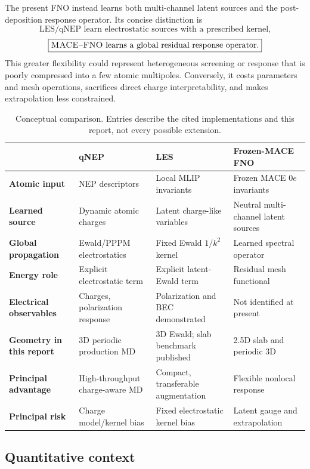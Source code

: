 \documentclass[11pt]{article}
\newcommand{\macefno}{\textsc{MACE--FNO}}
\begin{document}
The present FNO instead learns both multi-channel latent sources and the
post-deposition response operator. Its concise distinction is
\[
\boxed{\text{LES/qNEP learn electrostatic sources with a prescribed kernel,}}
\]
\[
\boxed{\text{\macefno{} learns a global residual response operator.}}
\]
This greater flexibility could represent heterogeneous screening or response
that is poorly compressed into a few atomic multipoles. Conversely, it costs
parameters and mesh operations, sacrifices direct charge interpretability,
and makes extrapolation less constrained.

\begin{table}[t]
\centering
\caption{Conceptual comparison. Entries describe the cited implementations
and this report, not every possible extension.}
\label{tab:method-comparison}
\small
\begin{tabularx}{\textwidth}{>{\bfseries}lXXX}
\toprule
 & qNEP & LES & Frozen-MACE FNO\\
\midrule
Atomic input & NEP descriptors & Local MLIP invariants &
Frozen MACE \(0e\) invariants\\
Learned source & Dynamic atomic charges & Latent charge-like variables &
Neutral multi-channel latent sources\\
Global propagation & Ewald/PPPM electrostatics & Fixed Ewald \(1/k^2\) kernel &
Learned spectral operator\\
Energy role & Explicit electrostatic term & Explicit latent-Ewald term &
Residual mesh functional\\
Electrical observables & Charges, polarization response &
Polarization and BEC demonstrated & Not identified at present\\
Geometry in this report & 3D periodic production MD &
3D Ewald; slab benchmark published & 2.5D slab and periodic 3D\\
Principal advantage & High-throughput charge-aware MD &
Compact, transferable augmentation & Flexible nonlocal response\\
Principal risk & Charge model/kernel bias & Fixed electrostatic kernel bias &
Latent gauge and extrapolation\\
\bottomrule
\end{tabularx}
\end{table}

\subsection{Quantitative context}
\end{document}
